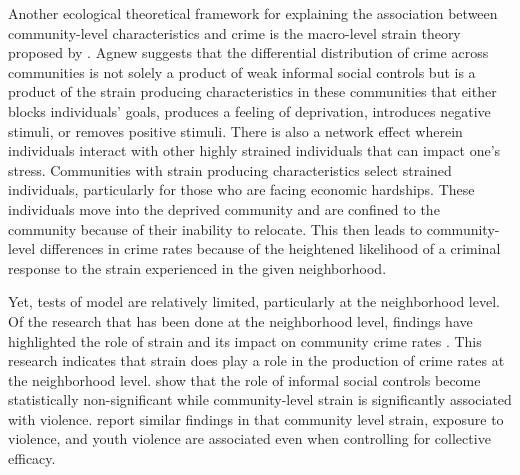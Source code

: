 Another ecological theoretical framework for explaining the association between community-level characteristics and crime is the macro-level strain theory proposed by \parencite{agnew_robert_general_1999}. Agnew suggests that the differential distribution of crime across communities is not solely a product of weak informal social controls but is a product of the strain producing characteristics in these communities that either blocks individuals’ goals, produces a feeling of deprivation, introduces negative stimuli, or removes positive stimuli. There is also a network effect wherein individuals interact with other highly strained individuals that can impact one’s stress. Communities with strain producing characteristics select strained individuals, particularly for those who are facing economic hardships. These individuals move into the deprived community and are confined to the community because of their inability to relocate. This then leads to community-level differences in crime rates because of the heightened likelihood of a criminal response to the strain experienced in the given neighborhood.

Yet, tests of \textcite{agnew_robert_general_1999} model are relatively limited, particularly at the neighborhood level. Of the research that has been done at the neighborhood level, findings have highlighted the role of strain and its impact on community crime rates \parencite{antunes_social_2022, warner_strain_2003}. This research indicates that strain does play a role in the production of crime rates at the neighborhood level. \textcite{warner_strain_2003} show that the role of informal social controls become statistically non-significant while community-level strain is significantly associated with violence. \textcite{antunes_social_2022} report similar findings in that community level strain, exposure to violence, and youth violence are associated even when controlling for collective efficacy. 

